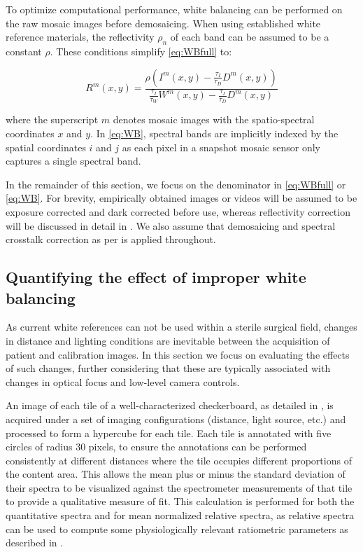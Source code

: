 To optimize computational performance, white balancing can be performed on the raw mosaic images before demosaicing. When using established white reference materials, the reflectivity $\rho_n$ of each band can be assumed to be a constant $\rho$. These conditions simplify \eqref{eq:WBfull} to:
%
\begin{linenomath*}
\begin{equation}
    R^m(x,y) = \frac{\rho\left(I^m(x,y) - \frac{\tau_I}{\tau_D}D^m(x,y)\right)}{\frac{\tau_I}{\tau_W}W^m(x,y) - \frac{\tau_I}{\tau_D}D^m(x,y)}
\label{eq:WB}
\end{equation}
\end{linenomath*}
where the superscript $m$ denotes mosaic images with the spatio-spectral coordinates $x$ and $y$.
In \eqref{eq:WB}, spectral bands are implicitly indexed by the spatial coordinates $i$ and $j$ as each pixel in a snapshot mosaic sensor only captures a single spectral band.

In the remainder of this section, we focus on the denominator in \eqref{eq:WBfull} or \eqref{eq:WB}.
For brevity, empirically obtained images or videos will be assumed to be exposure corrected and dark corrected before use, whereas reflectivity correction will be discussed in detail in .
We also assume that demosaicing and spectral crosstalk correction as per \citet{Pichette2017} is applied throughout.

%
\subsection{Quantifying the effect of improper white balancing}
\label{methodmotivation}
%
As current white references 
%
can not be used within
a sterile surgical field, changes in distance and lighting conditions are inevitable between the acquisition of patient and calibration images. 
%
In this section we focus on evaluating the effects of such changes, further considering that these are typically associated with changes in optical focus and low-level camera controls.
%

An image of each tile of a well-characterized checkerboard, as detailed in , is acquired under a set of imaging configurations (distance, light source, etc.) and processed to form a hypercube for each tile.
%
Each tile is annotated with five circles of radius 30 pixels, to ensure the annotations can be performed consistently at different distances where the tile occupies different proportions of the content area. This allows the mean plus or minus the standard deviation of their spectra to be visualized against the spectrometer measurements of that tile to provide a qualitative measure of fit.
This calculation is performed for both the quantitative spectra and for mean normalized relative spectra, as relative spectra can be used to compute some physiologically relevant ratiometric parameters as described in . 

